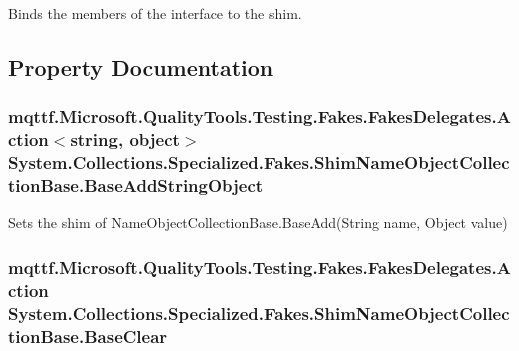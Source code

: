 Binds the members of the interface to the shim.



\subsection{Property Documentation}
\hypertarget{class_system_1_1_collections_1_1_specialized_1_1_fakes_1_1_shim_name_object_collection_base_a48749cd26178115aae126bad0716c685}{
\subsubsection[{Base\-Add\-String\-Object}]{\setlength{\rightskip}{0pt plus 5cm}mqttf.\-Microsoft.\-Quality\-Tools.\-Testing.\-Fakes.\-Fakes\-Delegates.\-Action$<$string, object$>$ System.\-Collections.\-Specialized.\-Fakes.\-Shim\-Name\-Object\-Collection\-Base.\-Base\-Add\-String\-Object\hspace{0.3cm}{\ttfamily [set]}}}\label{class_system_1_1_collections_1_1_specialized_1_1_fakes_1_1_shim_name_object_collection_base_a48749cd26178115aae126bad0716c685}


Sets the shim of Name\-Object\-Collection\-Base.\-Base\-Add(\-String name, Object value)

\hypertarget{class_system_1_1_collections_1_1_specialized_1_1_fakes_1_1_shim_name_object_collection_base_a213c396baaed29d889e67bf84848fe2b}{
\subsubsection[{Base\-Clear}]{\setlength{\rightskip}{0pt plus 5cm}mqttf.\-Microsoft.\-Quality\-Tools.\-Testing.\-Fakes.\-Fakes\-Delegates.\-Action System.\-Collections.\-Specialized.\-Fakes.\-Shim\-Name\-Object\-Collection\-Base.\-Base\-Clear\hspace{0.3cm}{\ttfamily [set]}}}\label{class_system_1_1_collections_1_1_specialized_1_1_fakes_1_1_shim_name_object_collection_base_a213c396baaed29d889e67bf84848fe2b}


